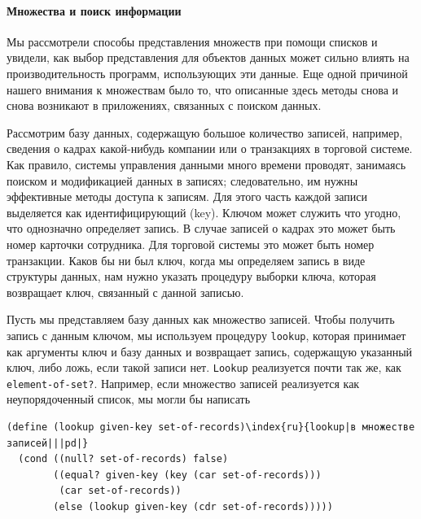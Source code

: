 \paragraph{Множества и поиск информации}


Мы рассмотрели способы представления множеств при помощи списков и увидели, как выбор представления для объектов
данных может сильно влиять на производительность программ, использующих эти 
данные.  Еще одной причиной нашего внимания к множествам
было то, что описанные здесь методы снова и снова возникают в
приложениях, связанных с поиском данных.

Рассмотрим базу данных, содержащую большое количество 
записей, например, сведения о кадрах какой-нибудь компании или
о транзакциях в торговой системе.  Как правило, системы управления
данными много времени проводят, занимаясь поиском и модификацией данных в
записях; следовательно, им нужны эффективные методы доступа к
записям.  Для этого часть каждой записи выделяется как
идентифицирующий  (key).  
Ключом может служить 
что угодно, что однозначно определяет запись.  В случае записей о
кадрах это может быть номер карточки сотрудника.  Для торговой системы 
это может быть номер транзакции.  Каков бы ни был ключ,  когда мы
определяем запись в виде структуры данных, нам нужно указать процедуру 
выборки ключа,
которая возвращает ключ, связанный с данной
записью.

Пусть мы представляем базу данных как множество записей.
Чтобы получить запись с данным ключом, мы используем процедуру
{\tt lookup}, которая принимает как аргументы ключ и базу
данных и возвращает запись, содержащую указанный ключ, либо ложь, если
такой записи нет.  {\tt Lookup} реализуется почти так же, как
{\tt element-of-set?}.  Например, если множество записей
реализуется как неупорядоченный список, мы могли бы написать

\begin{Verbatim}[fontsize=\small]
(define (lookup given-key set-of-records)\index{ru}{lookup|в множестве записей|||pd|}
  (cond ((null? set-of-records) false)
        ((equal? given-key (key (car set-of-records)))
         (car set-of-records))
        (else (lookup given-key (cdr set-of-records)))))
\end{Verbatim}


